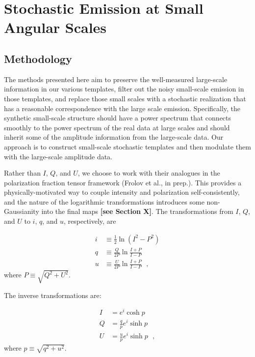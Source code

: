 \section{Stochastic Emission at Small Angular Scales} \label{sec:small_scales} 

\subsection{Methodology}\label{subsec:methodology}
The methods presented here aim to preserve the well-measured large-scale information in our various templates, filter out the noisy small-scale emission in those templates, and replace those small scales with a stochastic realization that has a reasonable correspondence with the large scale emission. Specifically, the synthetic small-scale structure should have a power spectrum that connects smoothly to the power spectrum of the real data at large scales and should inherit some of the amplitude information from the large-scale data. Our approach is to construct small-scale stochastic templates and then modulate them with the large-scale amplitude data.

Rather than $I$, $Q$, and $U$, we choose to work with their analogues in the polarization fraction tensor framework (Frolov et al., in prep.). This provides a physically-motivated way to couple intensity and polarization self-consistently, and the nature of the logarithmic transformations introduces some non-Gaussianity into the final maps {\bf [see Section X]}. The transformations from $I$, $Q$, and $U$ to $i$, $q$, and $u$, respectively, are

\begin{align}
    i &\equiv \frac{1}{2} \ln (I^2 - P^2)\nonumber  \\
    q &\equiv  \frac{Q}{2P} \ln \frac{I+P}{I-P} \label{eq:pt2real}\\
    u &\equiv  \frac{U}{2P} \ln \frac{I+P}{I-P}\nonumber 
    ~~~,
\end{align}
where $P \equiv \sqrt{Q^2 + U^2}$.

The inverse transformations are:

\begin{align}
    I &= e^i \cosh p \nonumber \\
    Q &= \frac{q}{p}e^i\sinh p \label{eq:real2pt} \\
    U &= \frac{u}{p}e^i\sinh p \nonumber
    ~~~,\label{eq:real2pt}
\end{align}
where $p \equiv \sqrt{q^2 + u^2}$.

